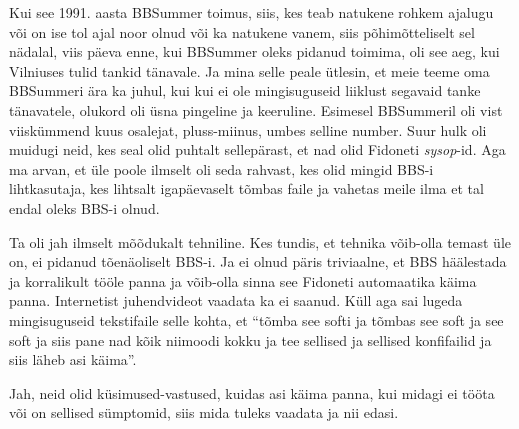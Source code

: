 Kui see 1991. aasta BBSummer toimus, 
 siis, kes teab natukene rohkem ajalugu või 
on ise tol ajal noor olnud või ka natukene vanem, siis põhimõtteliselt sel 
nädalal,  viis päeva enne, kui BBSummer oleks pidanud toimima, oli see aeg, kui 
Vilniuses  tulid tankid tänavale. Ja mina selle peale ütlesin, et  meie teeme 
oma BBSummeri ära ka juhul, kui kui ei ole mingisuguseid liiklust segavaid 
tanke tänavatele, olukord oli üsna pingeline ja keeruline. Esimesel BBSummeril 
oli vist viiskümmend kuus osalejat, pluss-miinus, umbes selline number. Suur 
hulk oli muidugi neid, kes seal olid puhtalt  sellepärast, et nad olid Fidoneti 
\emph{sysop}-id. Aga ma arvan, et  üle poole ilmselt oli seda rahvast, kes  
olid mingid BBS-i lihtkasutaja, kes lihtsalt igapäevaselt tõmbas faile ja 
vahetas meile ilma et tal endal oleks BBS-i olnud.


Ta oli jah ilmselt mõõdukalt tehniline. Kes tundis, et tehnika võib-olla temast 
üle on, ei pidanud tõenäoliselt BBS-i. Ja ei olnud päris triviaalne, et BBS 
häälestada ja korralikult tööle panna ja võib-olla sinna see Fidoneti 
automaatika käima panna. Internetist juhendvideot vaadata ka ei saanud. Küll 
aga sai lugeda mingisuguseid tekstifaile  selle kohta, et \enquote{tõmba see 
softi ja tõmbas see soft ja see soft ja siis pane nad kõik niimoodi kokku ja  
tee sellised ja sellised konfifailid ja siis läheb asi käima}.


Jah, neid  olid küsimused-vastused, kuidas asi käima panna, kui midagi ei tööta 
või on sellised sümptomid, siis mida tuleks vaadata ja nii edasi.


